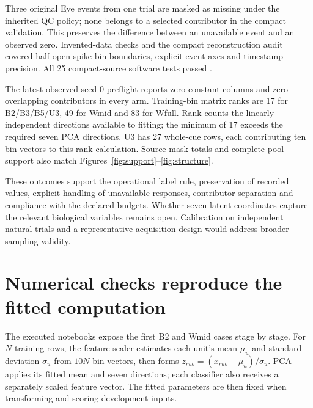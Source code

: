 \documentclass[10pt,a4paper]{article}
\begin{document}
Three original Eye events from one trial are masked as missing under the inherited QC policy; none belongs to a selected contributor in the compact validation. This preserves the difference between an unavailable event and an observed zero. Invented-data checks and the compact reconstruction audit covered half-open spike-bin boundaries, explicit event axes and timestamp precision. All 25 compact-source software tests passed \cite{compact}.

The latest observed seed-0 preflight reports zero constant columns and zero overlapping contributors in every arm. Training-bin matrix ranks are 17 for B2/B3/B5/U3, 49 for Wmid and 83 for Wfull. Rank counts the linearly independent directions available to fitting; the minimum of 17 exceeds the required seven PCA directions. U3 has 27 whole-cue rows, each contributing ten bin vectors to this rank calculation. Source-mask totals and complete pool support also match Figures~\ref{fig:support}--\ref{fig:structure}.

These outcomes support the operational label rule, preservation of recorded values, explicit handling of unavailable responses, contributor separation and compliance with the declared budgets. Whether seven latent coordinates capture the relevant biological variables remains open. Calibration on independent natural trials and a representative acquisition design would address broader sampling validity.

\clearpage
\section{Numerical checks reproduce the fitted computation}\label{app:numerical}
The executed notebooks expose the first B2 and Wmid cases stage by stage. For $N$ training rows, the feature scaler estimates each unit's mean $\mu_u$ and standard deviation $\sigma_u$ from $10N$ bin vectors, then forms $z_{rub}=(x_{rub}-\mu_u)/\sigma_u$. PCA applies its fitted mean and seven directions; each classifier also receives a separately scaled feature vector. The fitted parameters are then fixed when transforming and scoring development inputs.
\end{document}
